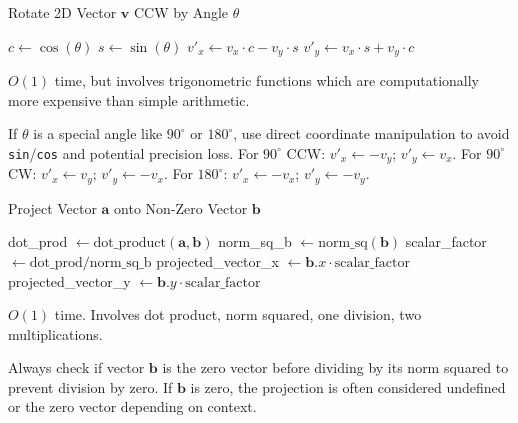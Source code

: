 \begin{algorithm}[H]
\caption{Rotate 2D Vector $\mathbf{v}$ CCW by Angle $\theta$}
\label{alg:A.2.1.rotate_vector}
$c \leftarrow \cos(\theta)$\;
$s \leftarrow \sin(\theta)$\;
$v'_x \leftarrow v_x \cdot c - v_y \cdot s$\;
$v'_y \leftarrow v_x \cdot s + v_y \cdot c$\;
\end{algorithm}
\begin{complexity}
\label{comp:A.2.1.rotate_vector}
$O(1)$ time, but involves trigonometric functions which are computationally more expensive than simple arithmetic.
\end{complexity}
\begin{implementation}
\label{impl:A.2.1.rotate_vector_precision}
If $\theta$ is a special angle like $90^\circ$ or $180^\circ$, use direct coordinate manipulation to avoid \texttt{sin}/\texttt{cos} and potential precision loss.
For $90^\circ$ CCW: $v'_x \leftarrow -v_y$; $v'_y \leftarrow v_x$.
For $90^\circ$ CW: $v'_x \leftarrow v_y$; $v'_y \leftarrow -v_x$.
For $180^\circ$: $v'_x \leftarrow -v_x$; $v'_y \leftarrow -v_y$.
\end{implementation}

\begin{algorithm}[H]
\caption{Project Vector $\mathbf{a}$ onto Non-Zero Vector $\mathbf{b}$}
\label{alg:A.2.1.project_vector}
 {   }
dot\_prod $\leftarrow \text{dot\_product}(\mathbf{a}, \mathbf{b})$\;
norm\_sq\_b $\leftarrow \text{norm\_sq}(\mathbf{b})$\;
 {
     
}
scalar\_factor $\leftarrow \text{dot\_prod} / \text{norm\_sq\_b}$\;
projected\_vector\_x $\leftarrow \mathbf{b}.x \cdot \text{scalar\_factor}$\;
projected\_vector\_y $\leftarrow \mathbf{b}.y \cdot \text{scalar\_factor}$\;
\end{algorithm}
\begin{complexity}
\label{comp:A.2.1.project_vector}
$O(1)$ time. Involves dot product, norm squared, one division, two multiplications.
\end{complexity}
\begin{warning}
\label{warn:A.2.1.project_vector_zero}
Always check if vector $\mathbf{b}$ is the zero vector before dividing by its norm squared to prevent division by zero. If $\mathbf{b}$ is zero, the projection is often considered undefined or the zero vector depending on context.
\end{warning}
